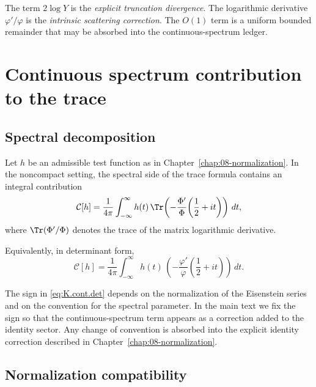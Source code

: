 \begin{remark}
\label{rem:K.ms.canonical}
The term $2\log Y$ is the \emph{explicit truncation divergence}.
The logarithmic derivative $\varphi'/\varphi$ is the \emph{intrinsic scattering correction}.
The $O(1)$ term is a uniform bounded remainder that may be absorbed into the continuous-spectrum ledger.
\end{remark}

\section{Continuous spectrum contribution to the trace}
\label{sec:K.trace.cont}

\subsection{Spectral decomposition}
\label{subsec:K.spectral.decomp}

Let $h$ be an admissible test function as in Chapter~\ref{chap:08-normalization}.
In the noncompact setting, the spectral side of the trace formula contains an integral contribution
\begin{equation}\label{eq:K.cont.spectral}
\mathcal{C}[h]
=
\frac{1}{4\pi}
\int_{-\infty}^{\infty}
h(t)\,
\Tr\!\left(
-\frac{\Phi'}{\Phi}\!\left(\frac12+it\right)
\right)\,dt,
\end{equation}
where $\Tr(\Phi'/\Phi)$ denotes the trace of the matrix logarithmic derivative.

Equivalently, in determinant form,
\begin{equation}\label{eq:K.cont.det}
\mathcal{C}[h]
=
\frac{1}{4\pi}
\int_{-\infty}^{\infty}
h(t)\,
\left(
-\frac{\varphi'}{\varphi}\!\left(\frac12+it\right)
\right)\,dt.
\end{equation}

\begin{remark}
\label{rem:K.sign}
The sign in \eqref{eq:K.cont.det} depends on the normalization of the Eisenstein series and on the convention for the
spectral parameter.  In the main text we fix the sign so that the continuous-spectrum term appears as a correction
added to the identity sector.  Any change of convention is absorbed into the explicit identity correction described
in Chapter~\ref{chap:08-normalization}.
\end{remark}

\subsection{Normalization compatibility}
\label{subsec:K.norm.compat}


